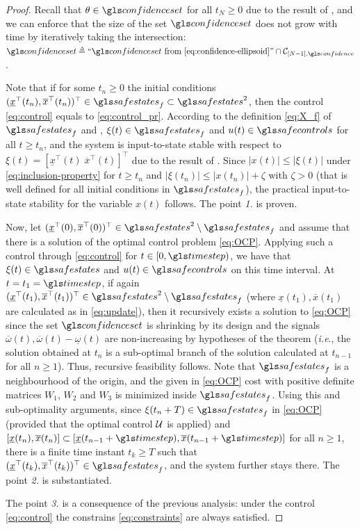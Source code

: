 \begin{proof}
	Recall that $\theta\in\confidenceset$ for all $t_N\geq 0$ due to the
	result of , and we can enforce that the size of the set $\confidenceset$
	does not grow with time by iteratively taking the intersection: $\confidenceset \eqdef ``\confidenceset\text{ from \eqref{eq:confidence-ellipsoid}}" \cap \cC_{[N-1],\confidence}$.
	
	Note that if for some $t_{n}\geq0$ the initial conditions $(\underline{x}^{\top}(t_{n}),\overline{x}^{\top}(t_{n}))^{\top}\in\safestates_{f}\subset\safestates^{2}$,
	then the control \eqref{eq:control} equals to \eqref{eq:control_pr}.
	According to the definition \eqref{eq:X_f} of $\safestates_{f}$ and , $\xi(t)\in\safestates_{f}$ and $u(t)\in\safecontrols$ for all $t\geq t_{n}$,
	and the system is input-to-state stable with respect to $\xi(t)=[\underline{x}^{\top}(t)\;\overline{x}^{\top}(t)]^{\top}$
	due to the result of . Since $|x(t)|\leq|\xi(t)|$
	under \eqref{eq:inclusion-property} for $t\geq t_{n}$ and $|\xi(t_{n})|\leq|x(t_{n})|+\zeta$
	with $\zeta>0$ (that is well defined for all initial conditions in
	$\safestates_{f}$), the practical input-to-state stability for the variable
	$x(t)$ follows. The point \emph{1.} is proven.
	
	Now, let $(\underline{x}^{\top}(0),\overline{x}^{\top}(0))^{\top}\in\safestates^{2}\setminus\safestates_{f}$
	and assume that there is a solution of the optimal control problem
	\eqref{eq:OCP}. Applying such a control through \eqref{eq:control}
	for $t\in[0,\timestep)$, we have that $\xi(t)\in\safestates$ and $u(t)\in\safecontrols$
	on this time interval. At $t=t_{1}=\timestep$, if again $(\underline{x}^{\top}(t_{1}),\overline{x}^{\top}(t_{1}))^{\top}\in\safestates^{2}\setminus\safestates_{f}$
	(where $\underline{x}(t_{1}),\overline{x}(t_{1})$ are calculated
	as in \eqref{eq:update}), then it recursively exists a solution to
	\eqref{eq:OCP} since the set $\confidenceset$ is shrinking by its
	design and the signals $\overline{\omega}(t),\overline{\omega}(t)-\underline{\omega}(t)$
	are non-increasing by hypotheses of the theorem (\emph{i.e}., the
	solution obtained at $t_{n}$ is a sub-optimal branch of the solution
	calculated at $t_{n-1}$ for all $n\geq1$). Thus, recursive feasibility
	follows. Note that $\safestates_{f}$ is a neighbourhood of the origin, and
	the given in \eqref{eq:OCP} cost with positive definite matrices
	$W_{1}$, $W_{2}$ and $W_{3}$ is minimized inside $\safestates_{f}$. Using
	this and sub-optimality arguments, since $\xi(t_{n}+T)\in\safestates_{f}$
	in \eqref{eq:OCP} (provided that the optimal control $\mathcal{U}$ is applied)
	and $[\underline{x}(t_{n}),\overline{x}(t_{n})]\subset[\underline{x}(t_{n-1}+\timestep),\overline{x}(t_{n-1}+\timestep)]$
	for all $n\geq1$, there is a finite time instant $t_{k}\geq T$ such
	that $(\underline{x}^{\top}(t_{k}),\overline{x}^{\top}(t_{k}))^{\top}\in\safestates_{f}$,
	and the system further stays there. The point \emph{2.} is substantiated.
	
	The point \emph{3.} is a consequence of the previous analysis: under
	the control \eqref{eq:control} the constrains \eqref{eq:constraints}
	are always satisfied.
\end{proof}
